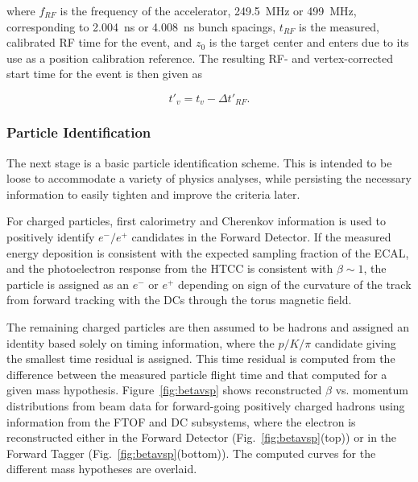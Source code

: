 \noindent
where $f_{RF}$ is the frequency of the accelerator, 249.5~MHz or 499~MHz, corresponding to 2.004~ns or
4.008~ns bunch spacings, $t_{RF}$ is the measured, calibrated RF time for the event, and $z_0$ is the target
center and enters due to its use as a position calibration reference. The resulting RF- and vertex-corrected
start time for the event is then given as

\begin{equation}
  \label{eq:starttime}
t'_v = t_v - \Delta t'_{RF}.
\end{equation}

\subsubsection{Particle Identification}

The next stage is a basic particle identification scheme.  This is intended to be loose to accommodate a variety of
physics analyses, while persisting the necessary information to easily tighten and improve the criteria later.

For charged particles, first calorimetry and Cherenkov information is used to positively identify $e^-/e^+$
candidates in the Forward Detector. If the measured energy deposition is consistent with the expected sampling
fraction of the ECAL, and the photoelectron response from the HTCC is consistent with $\beta\sim1$, the particle
is assigned as an $e^-$ or $e^+$ depending on sign of the curvature of the track from forward tracking with the
DCs through the torus magnetic field. 

The remaining charged particles are then assumed to be hadrons and assigned an identity based solely on timing
information, where the $p/K/\pi$ candidate giving the smallest time residual is assigned. This time residual is
computed from the difference between the measured particle flight time and that computed for a given mass
hypothesis. Figure~\ref{fig:betavsp} shows reconstructed $\beta$ vs. momentum distributions from beam data
for forward-going positively charged hadrons using information from the FTOF and DC subsystems, where the
electron is reconstructed either in the Forward Detector (Fig.~\ref{fig:betavsp}(top)) or in the Forward Tagger
(Fig.~\ref{fig:betavsp}(bottom)). The computed curves for the different mass hypotheses are overlaid.

